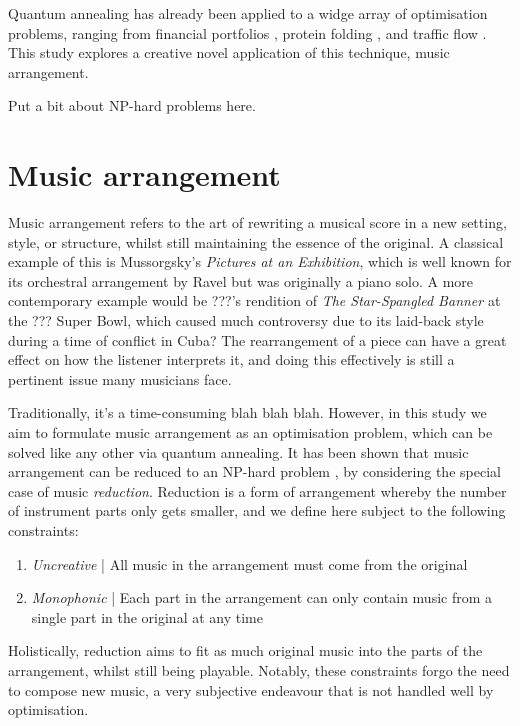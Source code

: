 \documentclass[12pt]{article}
\begin{document}
Quantum annealing has already been applied to a widge array of optimisation problems, ranging from financial portfolios \cite{phillipson_portfolio_2021}, protein folding \cite{perdomo-ortiz_protein_2012}, and traffic flow \cite{inoue_traffic_2021}. This study explores a creative novel application of this technique, music arrangement.

Put a bit about NP-hard problems here.

\section{Music arrangement}

Music arrangement refers to the art of rewriting a musical score in a new setting, style, or structure, whilst still maintaining the essence of the original. A classical example of this is Mussorgsky's \emph{Pictures at an Exhibition}, which is well known for its orchestral arrangement by Ravel but was originally a piano solo. A more contemporary example would be ???'s rendition of \emph{The Star-Spangled Banner} at the ??? Super Bowl, which caused much controversy due to its laid-back style during a time of conflict in Cuba? The rearrangement of a piece can have a great effect on how the listener interprets it, and doing this effectively is still a pertinent issue many musicians face.

Traditionally, it's a time-consuming blah blah blah. However, in this study we aim to formulate music arrangement as an optimisation problem, which can be solved like any other via quantum annealing. It has been shown that music arrangement can be reduced to an NP-hard problem \cite{moses_computational_2016}, by considering the special case of music \emph{reduction}. Reduction is a form of arrangement whereby the number of instrument parts only gets smaller, and we define here subject to the following constraints:

\begin{enumerate}
    \item \emph{Uncreative} | All music in the arrangement must come from the original
    \item \emph{Monophonic} | Each part in the arrangement can only contain music from a single part in the original at any time
\end{enumerate}

Holistically, reduction aims to fit as much original music into the parts of the arrangement, whilst still being playable. Notably, these constraints forgo the need to compose new music, a very subjective endeavour that is not handled well by optimisation.
\end{document}
